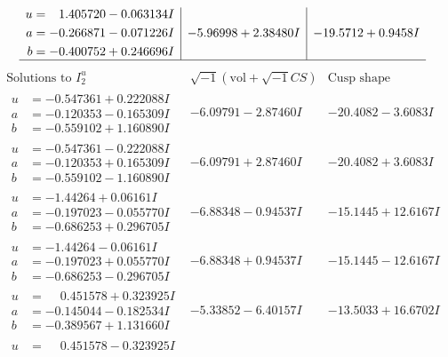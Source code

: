 \documentclass[1p]{elsarticle_modified}
\theoremstyle{definition}
\newcommand{\I}{\sqrt{-1}}
\begin{document}
$$\begin{array}{c|c|c}
\begin{aligned}
u &= \phantom{-}1.405720 - 0.063134 I \\
a &= -0.266871 - 0.071226 I \\
b &= -0.400752 + 0.246696 I\end{aligned}
 & -5.96998 + 2.38480 I & -19.5712 + 0.9458 I\\
 \hline 
 \end{array}$$\newpage$$\begin{array}{c|c|c}  
\text{Solutions to }I^u_{2}& \I (\text{vol} + \sqrt{-1}CS) & \text{Cusp shape}\\
 \hline 
\begin{aligned}
u &= -0.547361 + 0.222088 I \\
a &= -0.120353 - 0.165309 I \\
b &= -0.559102 + 1.160890 I\end{aligned}
 & -6.09791 - 2.87460 I & -20.4082 - 3.6083 I \\ \hline\begin{aligned}
u &= -0.547361 - 0.222088 I \\
a &= -0.120353 + 0.165309 I \\
b &= -0.559102 - 1.160890 I\end{aligned}
 & -6.09791 + 2.87460 I & -20.4082 + 3.6083 I \\ \hline\begin{aligned}
u &= -1.44264 + 0.06161 I \\
a &= -0.197023 - 0.055770 I \\
b &= -0.686253 + 0.296705 I\end{aligned}
 & -6.88348 - 0.94537 I & -15.1445 + 12.6167 I \\ \hline\begin{aligned}
u &= -1.44264 - 0.06161 I \\
a &= -0.197023 + 0.055770 I \\
b &= -0.686253 - 0.296705 I\end{aligned}
 & -6.88348 + 0.94537 I & -15.1445 - 12.6167 I \\ \hline\begin{aligned}
u &= \phantom{-}0.451578 + 0.323925 I \\
a &= -0.145044 - 0.182534 I \\
b &= -0.389567 + 1.131660 I\end{aligned}
 & -5.33852 - 6.40157 I & -13.5033 + 16.6702 I \\ \hline\begin{aligned}
u &= \phantom{-}0.451578 - 0.323925 I \\

\end{aligned}
\end{array}$$
\end{document}
